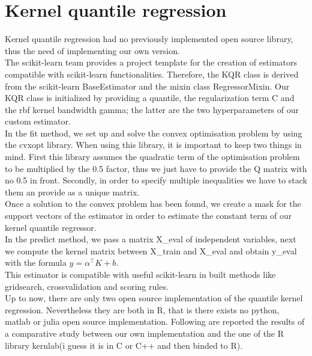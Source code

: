 \section{Kernel quantile regression}
Kernel quantile regression had no previously implemented open source library, thus the need of implementing our own version.
\\
The scikit-learn team provides a project template for the creation of estimators compatible with scikit-learn functionalities. Therefore, the KQR class is derived from the scikit-learn BaseEstimator and the mixin class RegressorMixin.
Our KQR class is initialized by providing a quantile, the regularization term C and the rbf kernel bandwidth gamma; the latter are the two hyperparameters of our custom estimator.
\\
In the fit method, we set up and solve the convex optimisation problem by using the cvxopt library. 
When using this library, it is important to keep two things in mind. First this library assumes the quadratic term of the optimisation problem to be multiplied by the 0.5 factor, thus we just have to provide the Q matrix with no 0.5 in front.
Secondly, in order to specify multiple inequalities we have to stack them an provide as a unique matrix.
\\
Once a solution to the convex problem has been found, we create a mask for the support vectors of the estimator in order to estimate the constant term of our kernel quantile regressor.
\\
In the predict method, we pass a matrix X\_eval of independent variables, next we compute the kernel matrix between X\_train and X\_eval and obtain y\_eval with the formula $y=\alpha^\intercal K+b$.
\\
This estimator is compatible with useful scikit-learn in built methods like gridsearch, crossvalidation and scoring rules.
\\
Up to now, there are only two open source implementation of the quantile kernel regression. Nevertheless they are both in R, that is there exists no python, matlab or julia open source implementation. Following are reported the results of a comparative study between our own implementation and the one of the R library kernlab(i guess it is in C or C++ and then binded to R).
